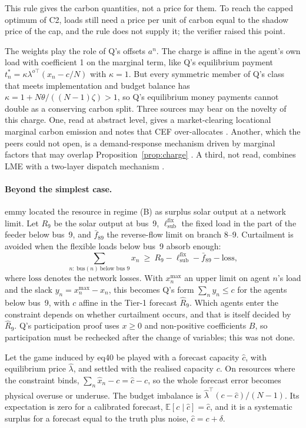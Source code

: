 \documentclass{article}
\begin{document}
This rule gives the carbon quantities, not a price for them.
To reach the capped optimum of C2, loads still need a price per unit of carbon equal to the shadow price of the cap, and the rule does not supply it; the verifier raised this point.

The weights play the role of Q's offsets \(a^n\).
The charge is affine in the agent's own load with coefficient 1 on the marginal term, like Q's equilibrium payment \(t^*_n=\kappa\lambda^{o\top}(x_n-c/N)\) with \(\kappa=1\).
But every symmetric member of Q's class that meets implementation and budget balance has \(\kappa=1+N\theta/((N-1)\zeta)>1\), so Q's equilibrium money payments cannot double as a conserving carbon split.
Three sources may bear on the novelty of this charge.
One, read at abstract level, gives a market-clearing locational marginal carbon emission and notes that CEF over-allocates \cite{arxiv240113182}.
Another, which the peers could not open, is a demand-response mechanism driven by marginal factors that may overlap Proposition~\ref{prop:charge} \cite{su18094398}.
A third, not read, combines LME with a two-layer dispatch mechanism \cite{arxiv260319530}.

\paragraph{Beyond the simplest case.}
emmy located the resource in regime (B) as surplus solar output at a network limit.
Let \(R_9\) be the solar output at bus~9, \(\ell^{\mathrm{fix}}_{\mathrm{sub}}\) the fixed load in the part of the feeder below bus~9, and \(\bar f_{89}\) the reverse-flow limit on branch 8--9.
Curtailment is avoided when the flexible loads below bus~9 absorb enough:
\[
\sum_{n:\ \mathrm{bus}(n)\ \text{below bus 9}}x_n\ \ge\ R_9-\ell^{\mathrm{fix}}_{\mathrm{sub}}-\bar f_{89}-\mathrm{loss},
\]
where \(\mathrm{loss}\) denotes the network losses.
With \(x^{\max}_n\) an upper limit on agent \(n\)'s load and the slack \(y_n=x^{\max}_n-x_n\), this becomes Q's form \(\sum_ny_n\le c\) for the agents below bus~9, with \(c\) affine in the Tier-1 forecast \(\hat R_9\).
Which agents enter the constraint depends on whether curtailment occurs, and that is itself decided by \(\hat R_9\).
Q's participation proof uses \(x\ge0\) and non-positive coefficients \(B\), so participation must be rechecked after the change of variables; this was not done.

\begin{proposition}\label{prop:forecast}
Let the game induced by eq40 be played with a forecast capacity \(\hat c\), with equilibrium price \(\hat\lambda\), and settled with the realised capacity \(c\).
On resources where the constraint binds, \(\sum_n\hat x_n-c=\hat c-c\), so the whole forecast error becomes physical overuse or underuse.
The budget imbalance is \(\hat\lambda^\top(c-\hat c)/(N-1)\).
Its expectation is zero for a calibrated forecast, \(\mathbb{E}[c\mid\hat c]=\hat c\), and it is a systematic surplus for a forecast equal to the truth plus noise, \(\hat c=c+\delta\).
\end{proposition}
\end{document}
